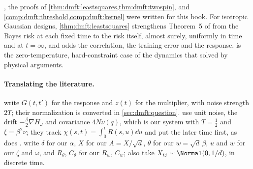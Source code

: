 \begin{refsection}
, the proofs of \cref{thm:dmft:leastsquares,thm:dmft:twospin}, and \cref{comp:dmft:threshold,comp:dmft:kernel} were written for this book. For isotropic Gaussian designs, \cref{thm:dmft:leastsquares} strengthens Theorem~5 of \textcite{AliKolterTibshirani2019} from the Bayes risk at each fixed time to the risk itself, almost surely, uniformly in time and at $t=\infty$, and adds the correlation, the training error and the response.  is the zero-temperature, hard-constraint case of the dynamics that \textcite{CugliandoloDean1995} solved by physical arguments.

\paragraph{Translating the literature.} \Textcite{CugliandoloKurchan1993} write $G(t,t')$ for the response and $z(t)$ for the multiplier, with noise strength $2T$; their normalization is converted in \cref{sec:dmft:question}. \Textcite{BenArousDemboGuionnet2006} use unit noise, the drift $-\frac\beta2\nabla H_J$ and covariance $4N\nu(q)$, which is our system with $T=\frac12$ and $\xi=\beta^2\nu$; they track $\chi(s,t)=\int_0^tR(s,u)\dd u$ and put the later time first, as does \textcite{Sellke2024}. \Textcite{CelentanoChengMontanari2021} write $\delta$ for our $\alpha$, $X$ for our $A=X/\sqrt d$, $\theta$ for our $w=\sqrt d\,\beta$, $u$ and $w$ for our $\zeta$ and $\omega$, and $R_\theta$, $C_\theta$ for our $R_w$, $C_w$; \textcite{GerbelotEtAl2024} also take $X_{ij}\sim\Normal(0,1/d)$, in discrete time.

\printchapterbib
\end{refsection}
